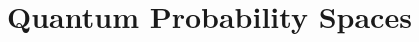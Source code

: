 \documentclass{article}
\theoremstyle{remark}
\newcommand{\imposs}{{\mbox{\wesa{impossible}}}}
\newcommand{\likely}{{\mbox{\wesa{likely}}}}
\newcommand{\unlikely}{{\mbox{\wesa{unlikely}}}}
\newcommand{\necess}{{\mbox{\wesa{certain}}}}
\begin{document}

\section{\label{sec:Quantum-Probability-Spaces}Quantum Probability Spaces}
\end{document}

